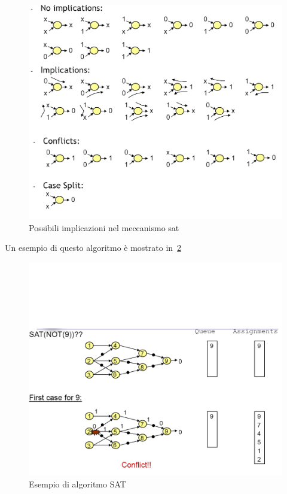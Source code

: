 \begin{figure}
\centering
\includegraphics[scale=0.4]{img/satimp.png}
\caption{Possibili implicazioni nel meccanismo sat}\label{fig:satimp}
\end{figure}
Un esempio di questo algoritmo è mostrato in \figurename\,\ref{fig:satexemp}
\begin{figure}
\centering
\includegraphics[scale=0.5]{img/satexemp.png}
\caption{Esempio di algoritmo SAT}\label{fig:satexemp}
\end{figure}
